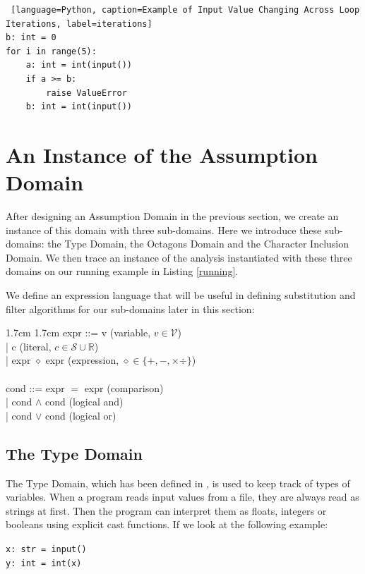 \documentclass[10pt]{report}
\begin{document}
\begin{lstlisting} [language=Python, caption=Example of Input Value Changing Across Loop Iterations, label=iterations]
b: int = 0
for i in range(5):
	a: int = int(input())
	if a >= b:
		raise ValueError
	b: int = int(input())
\end{lstlisting}


\section{An Instance of the Assumption Domain} \label{analysis-instance}
After designing an Assumption Domain in the previous section, we create an instance of this domain with three sub-domains. Here we introduce these sub-domains: the Type Domain, the Octagons Domain and the Character Inclusion Domain. We then trace an instance of the analysis instantiated with these three domains on our running example in Listing \ref{running}. 

We define an expression language that will be useful in defining substitution and filter algorithms for our sub-domains later in this section: \\
\begin{changemargin} {1.7cm} {1.7cm}
	expr ::= v \hfill (variable, $ v \in \mathcal{V} $) \\
\hspace*{10mm}	| c \hfill (literal, $ c \in \mathcal{S} \cup \mathbb{R} $) \\
\hspace*{10mm}	| expr $ \diamond $ expr \hfill (expression, $ \diamond \in \lbrace + , - , \times \div \rbrace $) \\ \\

cond ::= expr $ = $ expr \hfill (comparison) \\
\hspace*{10mm} | cond $ \wedge $ cond \hfill (logical and) \\
\hspace*{10mm} | cond $ \vee $ cond \hfill (logical or)
	
\end{changemargin}
	
\subsection{The Type Domain} \label{types}

The Type Domain, which has been defined in \cite{madelin}, is used to keep track of types of variables. When a program reads input values from a file, they are always read as strings at first. Then the program can interpret them as floats, integers or booleans using explicit cast functions. If we look at the following example:
\begin{center}
	\verb|x: str = input()| \\
	\verb|y: int = int(x)|
\end{center}
\end{document}
